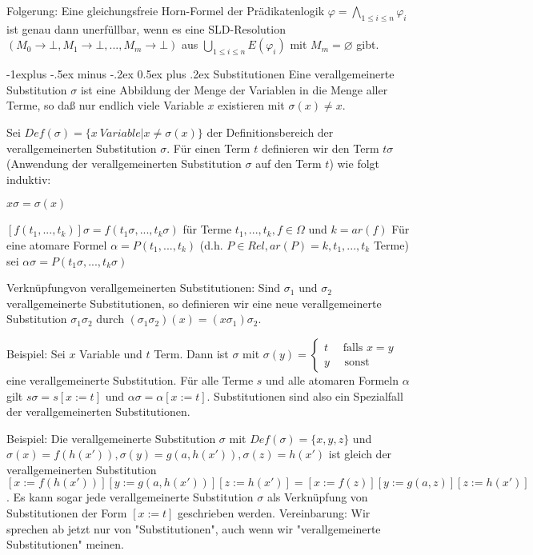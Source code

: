 \documentclass[a4paper]{article}
\makeatletter
\renewcommand{\subsection}{\@startsection{subsection}{2}{0mm}%
                {-1explus -.5ex minus -.2ex}%
                {0.5ex plus .2ex}%
                {\normalfont\normalsize\bfseries}}
\makeatother
\begin{document}
\begin{multicols}{3}
  Folgerung: Eine gleichungsfreie Horn-Formel der Prädikatenlogik $\varphi=\bigwedge_{1\leq i\leq n} \varphi_i$ ist genau dann unerfüllbar, wenn es eine SLD-Resolution $(M_0\rightarrow\bot,M_1\rightarrow\bot,...,M_m\rightarrow\bot)$ aus $\bigcup_{1\leq i\leq n} E(\varphi_i)$ mit $M_m =\varnothing$ gibt.

  \subsection{Substitutionen}
  Eine verallgemeinerte Substitution $\sigma$ ist eine Abbildung der Menge der Variablen in die Menge aller Terme, so daß nur endlich viele Variable $x$ existieren mit $\sigma(x) \not=x$.

  Sei $Def(\sigma)=\{x\ Variable|x\not =\sigma(x)\}$ der Definitionsbereich der verallgemeinerten Substitution $\sigma$. Für einen Term $t$ definieren wir den Term $t\sigma$ (Anwendung der verallgemeinerten Substitution $\sigma$ auf den Term $t$) wie folgt induktiv:
  \begin{itemize*}
    \item $x\sigma=\sigma(x)$
    \item $[f(t_1 ,... ,t_k)]\sigma=f(t_1\sigma,... ,t_k\sigma)$ für Terme $t_1,... ,t_k,f\in\Omega$ und $k=ar(f)$
    Für eine atomare Formel $\alpha=P(t_1 ,... ,t_k)$ (d.h. $P\in Rel,ar(P) =k,t_1 ,... ,t_k$ Terme) sei $\alpha\sigma = P(t_1\sigma,... ,t_k\sigma)$
  \end{itemize*}

  Verknüpfungvon verallgemeinerten Substitutionen: Sind $\sigma_1$ und $\sigma_2$ verallgemeinerte Substitutionen, so definieren wir eine neue verallgemeinerte Substitution $\sigma_1 \sigma_2$ durch $(\sigma_1 \sigma_2)(x) = (x\sigma_1)\sigma_2$.

  Beispiel: Sei $x$ Variable und $t$ Term. Dann ist $\sigma$ mit
  $\sigma(y) =\begin{cases} t \quad\text{ falls } x=y \\ y \quad\text{ sonst }\end{cases}$
  eine verallgemeinerte Substitution. Für alle Terme $s$ und alle atomaren Formeln $\alpha$ gilt
  $s\sigma=s[x:=t]$ und $\alpha\sigma=\alpha[x:=t]$.
  Substitutionen sind also ein Spezialfall der verallgemeinerten Substitutionen.

  Beispiel: Die verallgemeinerte Substitution $\sigma$ mit $Def(\sigma)=\{x,y,z\}$ und $\sigma(x) =f(h(x')), \sigma(y) =g(a,h(x')), \sigma(z) =h(x')$ ist gleich der verallgemeinerten Substitution $[x:=f(h(x'))] [y:=g(a,h(x'))] [z:=h(x')] = [x:=f(z)] [y:=g(a,z)] [z:=h(x')]$.
  Es kann sogar jede verallgemeinerte Substitution $\sigma$ als Verknüpfung von Substitutionen der Form $[x:=t]$ geschrieben werden.
  Vereinbarung: Wir sprechen ab jetzt nur von "Substitutionen", auch wenn wir "verallgemeinerte Substitutionen" meinen.


\end{multicols}
\end{document}
